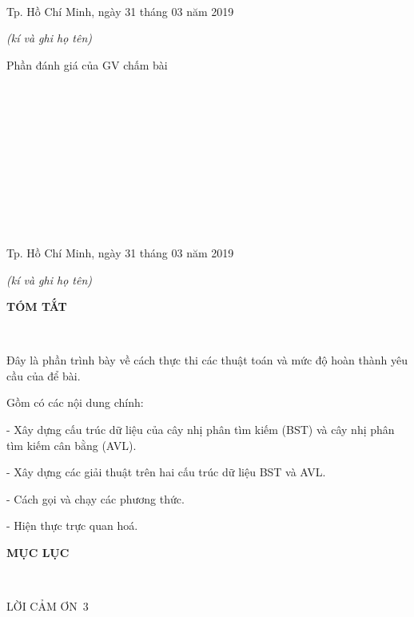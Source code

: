 \documentclass{report}
\begin{document}
\vspace{0.8cm}
\setlength{\parindent}{1cm}
\ \xfill{1pt} \

\bigskip
\ \xfill{1pt} \

\bigskip
\ \xfill{1pt} \

\bigskip
\ \xfill{1pt} \

\bigskip
\ \xfill{1pt} \

\bigskip
\ \xfill{1pt} \

\changefontsizes{12pt}
\setlength{\parindent}{8cm}
Tp. Hồ Chí Minh, ngày 31 tháng 03 năm 2019

\setlength{\parindent}{11cm}
\textit{(kí và ghi họ tên)}

\changefontsizes{13pt}
\vspace{2.5cm}
\setlength{\parindent}{2.2cm}
Phần đánh giá của GV chấm bài

\vspace{0.8cm}
\setlength{\parindent}{1cm}
\ \xfill{1pt} \

\bigskip
\ \xfill{1pt} \

\bigskip
\ \xfill{1pt} \

\bigskip
\ \xfill{1pt} \

\bigskip
\ \xfill{1pt} \

\bigskip
\ \xfill{1pt} \

\changefontsizes{12pt}
\setlength{\parindent}{8cm}
Tp. Hồ Chí Minh, ngày 31 tháng 03 năm 2019

\setlength{\parindent}{11cm}
\textit{(kí và ghi họ tên)}

\newpage
\changefontsizes{16pt}
\centerline{\textbf{TÓM TẮT}}\

\changefontsizes{13pt}
\setlength{\parindent}{2cm}
Đây là phần trình bày về cách thực thi các thuật toán và mức độ hoàn thành yêu cầu của để bài.

Gồm có các nội dung chính:

\setlength{\parindent}{3cm}
- Xây dựng cấu trúc dữ liệu của cây nhị phân tìm kiếm (BST)  và cây nhị phân tìm kiếm cân bằng (AVL).

- Xây dựng các giải thuật trên hai cấu trúc dữ liệu BST và AVL.

- Cách gọi và chạy các phương thức.

- Hiện thực trực quan hoá.

\newpage
\changefontsizes{16pt}
\centerline{\textbf{MỤC LỤC}}\

\vspace{1.2cm}
\changefontsizes{14pt}
\setlength{\parindent}{0cm}
LỜI CẢM ƠN\dotfill\ 3
\end{document}
